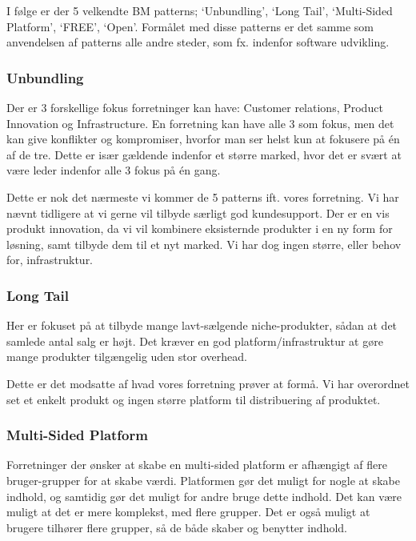
I følge \citet[pp. 52-119]{osterwalder2009business} er der 5 velkendte BM patterns; `Unbundling', `Long Tail', `Multi-Sided Platform', `FREE', `Open'.
Formålet med disse patterns er det samme som anvendelsen af patterns alle andre steder, som fx. indenfor software udvikling.

\subsubsection{Unbundling}
Der er 3 forskellige fokus forretninger kan have: Customer relations, Product Innovation og Infrastructure.
En forretning kan have alle 3 som fokus, men det kan give konflikter og kompromiser, hvorfor man ser helst kun at fokusere på én af de tre.
Dette er især gældende indenfor et større marked, hvor det er svært at være leder indenfor alle 3 fokus på én gang.

Dette er nok det nærmeste vi kommer de 5 patterns ift. vores forretning.
Vi har nævnt tidligere at vi gerne vil tilbyde særligt god kundesupport.
Der er en vis produkt innovation, da vi vil kombinere eksisternde produkter i en ny form for løsning, samt tilbyde dem til et nyt marked.
Vi har dog ingen større, eller behov for, infrastruktur.

\subsubsection{Long Tail}
Her er fokuset på at tilbyde mange lavt-sælgende niche-produkter, sådan at det samlede antal salg er højt.
Det kræver en god platform/infrastruktur at gøre mange produkter tilgængelig uden stor overhead.

Dette er det modsatte af hvad vores forretning prøver at formå.
Vi har overordnet set et enkelt produkt og ingen større platform til distribuering af produktet.

\subsubsection{Multi-Sided Platform}
Forretninger der ønsker at skabe en multi-sided platform er afhængigt af flere bruger-grupper for at skabe værdi.
Platformen gør det muligt for nogle at skabe indhold, og samtidig gør det muligt for andre bruge dette indhold.
Det kan være muligt at det er mere komplekst, med flere grupper.
Det er også muligt at brugere tilhører flere grupper, så de både skaber og benytter indhold.

